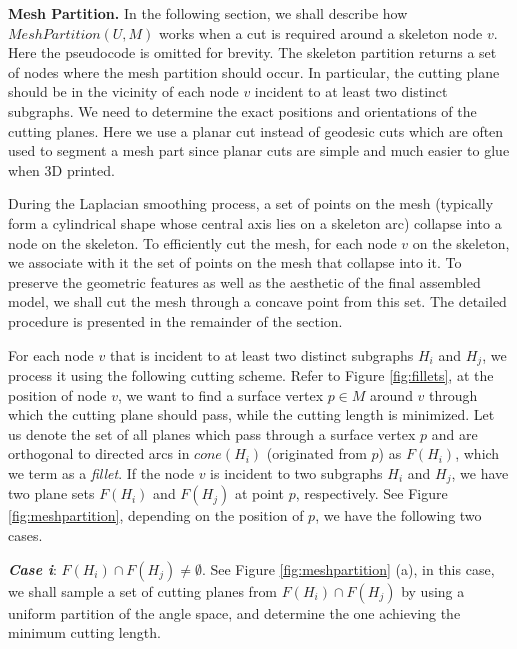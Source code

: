 \textbf{Mesh Partition.}
{{In the following section, we shall describe how $MeshPartition(U , M)$ works when a cut is required around a skeleton node $v$. Here the pseudocode is omitted for brevity.}}
The skeleton partition returns a set of nodes where the mesh partition should occur. In particular, the cutting plane should be in the vicinity of each node $v$ incident to at least two distinct subgraphs. We need to determine the exact positions and orientations of the cutting planes. Here we use a planar cut instead of geodesic cuts which are often used to segment a mesh part since planar cuts are simple and much easier to glue when 3D printed.

During the Laplacian smoothing process, a set of points on the mesh (typically form a cylindrical shape whose central axis lies on a skeleton arc) collapse into a node on the skeleton. To efficiently cut the mesh, for each node $v$ on the skeleton, we associate with it the set of points on the mesh that collapse into it. To preserve the geometric features as well as the aesthetic of the final assembled model, we shall cut the mesh through a concave point from this set. The detailed procedure is presented in the remainder of the section.

For each node $v$ that is incident to at least two distinct subgraphs $H_i$ and $H_j$, we process it using the following cutting scheme.
Refer to Figure \ref{fig:fillets}, at the position of node $v$, we want to find a surface vertex $p \in M$ around $v$ through which the cutting plane should pass, while the cutting length is minimized. Let us denote the set of all planes which pass through a surface vertex $p$ and are orthogonal to directed arcs in $cone(H_i)$ (originated from $p$) as $F(H_i)$, which we term as a \emph{fillet}. If the node $v$ is incident to two subgraphs $H_i$ and $H_j$, we have two plane sets $F(H_i)$ and $F(H_j)$ at point $p$, respectively. See Figure \ref{fig:meshpartition}, depending on the position of $p$, we have the following two cases.

\emph{\textbf{Case i}}: $F(H_i) \cap F(H_j) \neq \emptyset$. See Figure \ref{fig:meshpartition} (a), in this case, we shall sample a set of cutting planes from $F(H_i) \cap F(H_j)$ by using a uniform partition of the angle space, and determine the one achieving the minimum cutting length.

